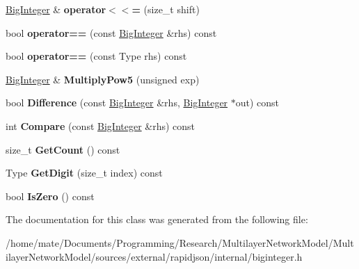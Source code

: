 \begin{DoxyCompactItemize}
\item 
\hyperlink{classinternal_1_1BigInteger}{Big\+Integer} \& {\bfseries operator$<$$<$=} (size\+\_\+t shift)\hypertarget{classinternal_1_1BigInteger_a48b12ef4676f19290dfd5816a4ef4a88}{}\label{classinternal_1_1BigInteger_a48b12ef4676f19290dfd5816a4ef4a88}

\item 
bool {\bfseries operator==} (const \hyperlink{classinternal_1_1BigInteger}{Big\+Integer} \&rhs) const \hypertarget{classinternal_1_1BigInteger_a567ecda3009de20400a2af649fb87e60}{}\label{classinternal_1_1BigInteger_a567ecda3009de20400a2af649fb87e60}

\item 
bool {\bfseries operator==} (const Type rhs) const \hypertarget{classinternal_1_1BigInteger_a329eddac1b724f82d56af2ee2c8abcc4}{}\label{classinternal_1_1BigInteger_a329eddac1b724f82d56af2ee2c8abcc4}

\item 
\hyperlink{classinternal_1_1BigInteger}{Big\+Integer} \& {\bfseries Multiply\+Pow5} (unsigned exp)\hypertarget{classinternal_1_1BigInteger_a98a13f169c27d1acfa57054f37c61763}{}\label{classinternal_1_1BigInteger_a98a13f169c27d1acfa57054f37c61763}

\item 
bool {\bfseries Difference} (const \hyperlink{classinternal_1_1BigInteger}{Big\+Integer} \&rhs, \hyperlink{classinternal_1_1BigInteger}{Big\+Integer} $\ast$out) const \hypertarget{classinternal_1_1BigInteger_a5741304ce36392adeef716e78b384b61}{}\label{classinternal_1_1BigInteger_a5741304ce36392adeef716e78b384b61}

\item 
int {\bfseries Compare} (const \hyperlink{classinternal_1_1BigInteger}{Big\+Integer} \&rhs) const \hypertarget{classinternal_1_1BigInteger_afd8b15480df5003ee6b6e1b8ecbf5f45}{}\label{classinternal_1_1BigInteger_afd8b15480df5003ee6b6e1b8ecbf5f45}

\item 
size\+\_\+t {\bfseries Get\+Count} () const \hypertarget{classinternal_1_1BigInteger_a720114cef0871c9f9c3c6a5f3a66e66a}{}\label{classinternal_1_1BigInteger_a720114cef0871c9f9c3c6a5f3a66e66a}

\item 
Type {\bfseries Get\+Digit} (size\+\_\+t index) const \hypertarget{classinternal_1_1BigInteger_a92c6854f2388875374cfb9801bea0cc8}{}\label{classinternal_1_1BigInteger_a92c6854f2388875374cfb9801bea0cc8}

\item 
bool {\bfseries Is\+Zero} () const \hypertarget{classinternal_1_1BigInteger_a99cf9cb87491a583c6b7614b0c8654fe}{}\label{classinternal_1_1BigInteger_a99cf9cb87491a583c6b7614b0c8654fe}

\end{DoxyCompactItemize}


The documentation for this class was generated from the following file\+:\begin{DoxyCompactItemize}
\item 
/home/mate/\+Documents/\+Programming/\+Research/\+Multilayer\+Network\+Model/\+Multilayer\+Network\+Model/sources/external/rapidjson/internal/biginteger.\+h\end{DoxyCompactItemize}
